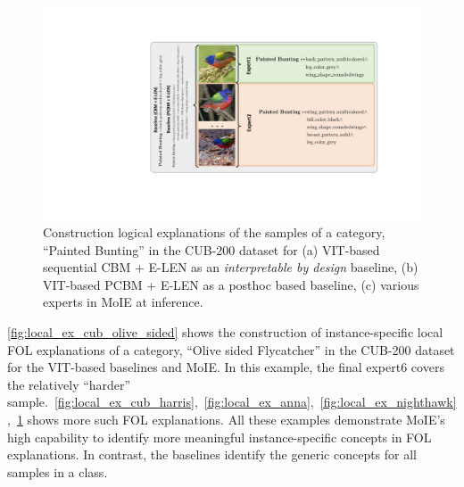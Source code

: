 \begin{figure}[h]
\centering
\includegraphics[width=1 \linewidth]{figures/Supp/Painted_bunting.pdf}
\vspace{-10pt}
\caption{Construction logical explanations of the samples of a category, ``Painted Bunting'' in the CUB-200 dataset for (a) VIT-based sequential CBM + E-LEN as an \emph{interpretable by design} baseline, (b) VIT-based PCBM + E-LEN as a posthoc based baseline, (c) various experts in MoIE at inference. }
\label{fig:local_ex_cub_painted}
\vspace{-2.5pt}
\end{figure}

\cref{fig:local_ex_cub_olive_sided} shows the construction of instance-specific local FOL explanations of a category, ``Olive sided Flycatcher'' in the CUB-200 dataset for the VIT-based baselines and MoIE. In this example, the final expert6 covers the relatively ``harder'' sample.~\cref{fig:local_ex_cub_harris},~\cref{fig:local_ex_anna},~\cref{fig:local_ex_nighthawk},~\cref{fig:local_ex_cub_painted} shows more such FOL explanations. All these examples demonstrate MoIE's high capability to identify more meaningful instance-specific concepts in FOL explanations. In contrast, the baselines identify the generic concepts for all samples in a class.



